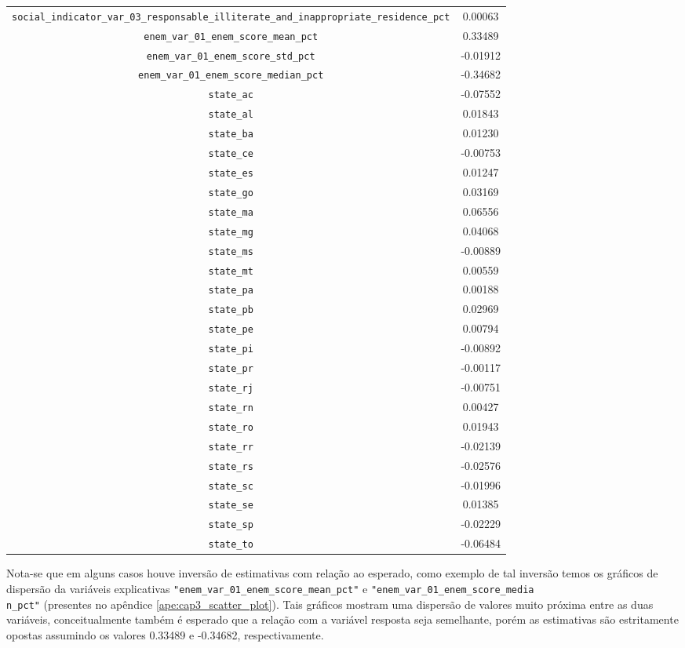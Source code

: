 \begin{table}[h]
\begin{adjustbox}{width=\textwidth}
\begin{tabular}{cc}
\verb|social_indicator_var_03_responsable_illiterate_and_inappropriate_residence_pct| &  0.00063 \\
\verb|enem_var_01_enem_score_mean_pct| &  0.33489 \\
\verb|enem_var_01_enem_score_std_pct|  & -0.01912 \\
\verb|enem_var_01_enem_score_median_pct|  & -0.34682 \\
\verb|state_ac|  & -0.07552 \\
\verb|state_al| &  0.01843 \\
\verb|state_ba| &  0.01230 \\
\verb|state_ce|  & -0.00753 \\
\verb|state_es| &  0.01247 \\
\verb|state_go| &  0.03169 \\
\verb|state_ma| &  0.06556 \\
\verb|state_mg| &  0.04068 \\
\verb|state_ms|  & -0.00889 \\
\verb|state_mt| &  0.00559 \\
\verb|state_pa| &  0.00188 \\
\verb|state_pb| &  0.02969 \\
\verb|state_pe| &  0.00794 \\
\verb|state_pi|  & -0.00892 \\
\verb|state_pr|  & -0.00117 \\
\verb|state_rj|  & -0.00751 \\
\verb|state_rn| &  0.00427 \\
\verb|state_ro| &  0.01943 \\
\verb|state_rr|  & -0.02139 \\
\verb|state_rs|  & -0.02576 \\
\verb|state_sc|  & -0.01996 \\
\verb|state_se| &  0.01385 \\
\verb|state_sp|  & -0.02229 \\
\verb|state_to|  & -0.06484 \\
\hline
\end{tabular}
\end{adjustbox}
\end{table}
\FloatBarrier

Nota-se que em alguns casos houve inversão de estimativas com relação ao esperado, como exemplo de tal inversão temos os gráficos de dispersão da variáveis explicativas \verb|"enem_var_01_enem_score_mean_pct"| e \verb|"enem_var_01_enem_score_media| \\ \verb|n_pct"| (presentes no apêndice \ref{ape:cap3_scatter_plot}). Tais gráficos mostram uma dispersão de valores muito próxima entre as duas variáveis, conceitualmente também é esperado que a relação com a variável resposta seja semelhante, porém as estimativas são estritamente opostas assumindo os valores 0.33489 e -0.34682, respectivamente.

